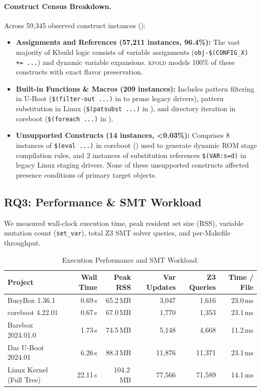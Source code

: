 \documentclass[acmsmall,screen,review]{acmart}
\newcommand{\tool}{\textsc{kfold}\xspace}
\begin{document}
\paragraph{Construct Census Breakdown.}
Across 59,345 observed construct instances ():
\begin{itemize}
\item \textbf{Assignments and References (57,211 instances, 96.4\%):} The vast majority of Kbuild logic consists of variable assignments (\texttt{obj-\$(CONFIG\_X) += ...}) and dynamic variable expansions. \tool models 100\% of these constructs with exact flavor preservation.
\item \textbf{Built-in Functions \& Macros (209 instances):} Includes pattern filtering in U-Boot (\texttt{\$(filter-out ...)} in  to prune legacy drivers), pattern substitution in Linux (\texttt{\$(patsubst ...)} in ), and directory iteration in coreboot (\texttt{\$(foreach ...)} in ).
\item \textbf{Unsupported Constructs (14 instances, <0.03\%):} Comprises 8 instances of \texttt{\$(eval ...)} in coreboot () used to generate dynamic ROM stage compilation rules, and 2 instances of substitution references \texttt{\$(VAR:s=d)} in legacy Linux staging drivers. None of these unsupported constructs affected presence conditions of primary target objects.
\end{itemize}

\subsection{RQ3: Performance \& SMT Workload}
\label{sec:eval:rq3}

We measured wall-clock execution time, peak resident set size (RSS), variable mutation count (\texttt{set\_var}), total Z3 SMT solver queries, and per-Makefile throughput.

\begin{table}[t]
\centering
\footnotesize
\setlength{\tabcolsep}{4pt}
\caption{Execution Performance and SMT Workload.}
\label{tab:rq3}
\begin{tabular}{lrrrrr}
\toprule
\textbf{Project} & \textbf{Wall Time} & \textbf{Peak RSS} & \textbf{Var Updates} & \textbf{Z3 Queries} & \textbf{Time / File} \\
\midrule
BusyBox 1.36.1 & 0.69\,s & 65.2\,MB & 3,047 & 1,616 & 23.0\,ms \\
coreboot 4.22.01 & 0.67\,s & 67.0\,MB & 1,770 & 1,353 & 23.1\,ms \\
Barebox 2024.01.0 & 1.73\,s & 74.5\,MB & 5,148 & 4,668 & 11.2\,ms \\
Das U-Boot 2024.01 & 6.26\,s & 88.3\,MB & 11,876 & 11,371 & 23.1\,ms \\
Linux Kernel (Full Tree) & 22.11\,s & 104.2\,MB & 77,566 & 71,589 & 14.1\,ms \\
\bottomrule
\end{tabular}
\end{table}
\end{document}
